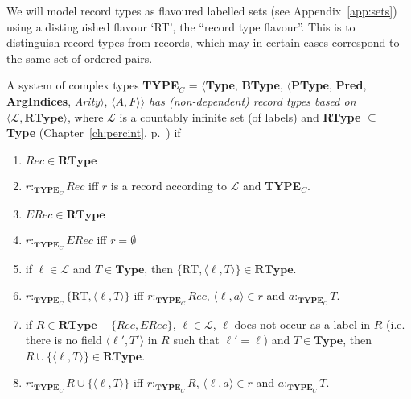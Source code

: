 We will model record types as flavoured labelled sets (see
Appendix~\ref{app:sets}) using a distinguished flavour `RT', the
``record type flavour''.  This is to distinguish record types from
records, which may in certain cases correspond to the same set of
ordered pairs.

A system of complex types \textbf{TYPE}$_C$ = $\langle${\bf Type}, {\bf BType},
$\langle$\textbf{PType}, {\bf Pred}, \textbf{ArgIndices}, {\it
  Arity\/}$\rangle$, $\langle A,F\rangle$$\rangle$ \textit{has
  (non-dependent) record
  types based on $\langle \mathcal{L}, \mathbf{RType}\rangle$},
 where $\mathcal{L}$ is a countably infinite set (of labels)
and \textbf{RType} $\subseteq$ \textbf{Type} 
(Chapter~\ref{ch:percint}, p.~\pageref{ex:ndrectypes}) if
\begin{enumerate} 
 
\item $\mathit{Rec}\in\mathbf{RType}$

\item $r:_{\mathbf{TYPE}_C}\mathit{Rec}$ iff $r$ is a record according
  to $\mathcal{L}$ and \textbf{TYPE$_C$}.

\item $\mathit{ERec}\in\mathbf{RType}$

\item $r:_{\mathbf{TYPE}_C}\mathit{ERec}$ iff $r=\emptyset$

\item if $\ell\in\mathcal{L}$ and $T\in\mathbf{Type}$, then
  $\{\text{RT},\langle\ell,T\rangle\}\in\mathbf{RType}$.

\item $r:_{\mathbf{TYPE}_C}\{\text{RT},\langle\ell,T\rangle\}$ iff
  $r:_{\mathbf{TYPE}_C}\mathit{Rec}$, $\langle\ell,a\rangle\in r$ and
  $a:_{\mathbf{TYPE}_C}T$.

\item if $R\in\mathbf{RType}-\{\mathit{Rec},\mathit{ERec}\}$, $\ell\in\mathcal{L}$, $\ell$ does not occur as a
  label in $R$ (i.e. there is no field $\langle\ell',T'\rangle$ in $R$
  such that $\ell'=\ell$) and $T\in\mathbf{Type}$, then
  $R\cup\{\langle\ell,T\rangle\}\in\mathbf{RType}$.\label{cl:ndrectype-emb}

\item $r:_{\mathbf{TYPE}_C}R\cup\{\langle\ell,T\rangle\}$ iff
  $r:_{\mathbf{TYPE}_C}R$, $\langle\ell,a\rangle\in r$ and $a:_{\mathbf{TYPE}_C}T$.
 
\end{enumerate}

